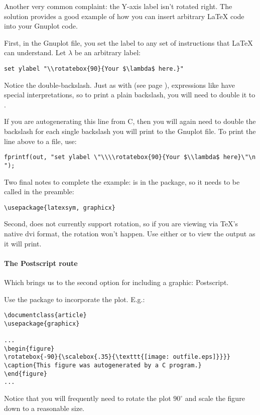 Another very common complaint: the Y-axis label isn't rotated right.
The solution provides a good example of how 
you can insert arbitrary \LaTeX{} code into your Gnuplot code.

First, in the Gnuplot file, you set the label to any set of instructions
that \LaTeX{} can understand. Let $\lambda$ be an arbitrary label:
\begin{lstlisting}
set ylabel "\\rotatebox{90}{Your $\lambda$ here.}"
\end{lstlisting}
Notice the double-backslash. Just as with  (see page
\pageref{printf}), expressions like  have special
interpretations, so to print a plain backslash, you will need to double
it to \ci{$\backslash\backslash$}. 

If you are autogenerating this line from C, then you will again need to
double the backslash for each single backslash you will print to the
Gnuplot file. To print the line above to a file, use:
\begin{lstlisting}
fprintf(out, "set ylabel \"\\\\rotatebox{90}{Your $\\lambda$ here}\"\n ");
\end{lstlisting}

Two final notes to complete the example: 
is in the  package, so it needs to be called in the preamble: 
\begin{lstlisting}
\usepackage{latexsym, graphicx}
\end{lstlisting}
Second,  does not currently support rotation, so if you are
viewing via \TeX's native dvi format, the rotation won't happen. Use
either  or  to view the output as it
will print.

\paragraph{The Postscript route}
Which brings us to the second option for including a graphic:
Postscript.

Use the  package to incorporate the plot. E.g.:
\begin{lstlisting}[language={}]
\documentclass{article}
\usepackage{graphicx}

...
\begin{figure}
\rotatebox{-90}{\scalebox{.35}{\texttt{[image: outfile.eps]}}}}
\caption{This figure was autogenerated by a C program.}
\end{figure}
...

\end{lstlisting}
Notice that you will frequently need to rotate the plot $90^\circ$
and scale the figure down to a reasonable size.

